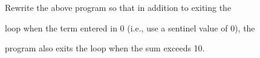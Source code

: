 Rewrite the above program so that in addition to exiting the

loop when the term entered in 0 (i.e., use a sentinel value of 0), the

program also exits the loop when the sum exceeds 10.

